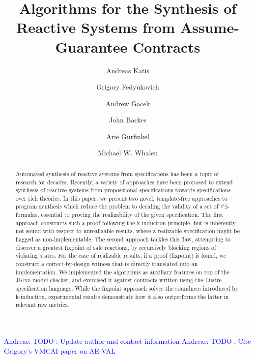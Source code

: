 \documentclass[smallcondenced]{svjour3}
\newcommand{\jkind}{\textsc{JKind}\xspace}
\newcommand{\andreas}[1]{\textcolor{blue}{Andreas: #1}}
\newcounter{template}
\begin{document}
\title{Algorithms for the Synthesis of Reactive Systems from Assume-Guarantee Contracts}
\andreas{TODO : Update author and contact information}
\andreas{TODO : Cite Grigory's VMCAI paper on AE-VAL}
\author{Andreas Katis \and Grigory Fedyukovich \and Andrew Gacek \and John Backes \and Arie Gurfinkel \and Michael W. Whalen}%
 



\maketitle

\begin{abstract}
Automated synthesis of reactive systems from specifications has been a topic of research for decades.  Recently, a variety of approaches have been proposed to extend synthesis of reactive systems from propositional specifications towards specifications over rich theories.
In this paper, we present two novel, template-free approaches to program synthesis which reduce the problem to deciding the validity of a set of $\forall\exists$-formulas, essential to proving the realizability of the given specification.
The first approach constructs such a proof following the k-induction principle, but is inherently not sound with respect to unrealizable results, where a realizable specification might be flagged as non-implementable. The second approach tackles this flaw, attempting to discover a greatest fixpoint of safe reactions, by recursively blocking regions of violating states. For the case of realizable results, if a proof (fixpoint) is found, we construct a correct-by-design witness that is directly translated into an implementation.
We implemented the algorithms as auxiliary features on top of the \jkind model checker, and exercised it against contracts written using the Lustre specification language.
While the fixpoint approach solves the soundness introduced by k-induction, experimental results demonstrate how it also outperforms the latter in relevant raw metrics.
\end{abstract}
\end{document}

